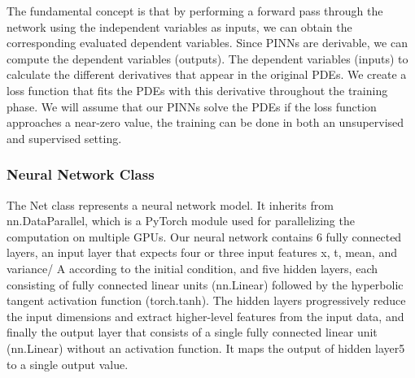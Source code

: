 \documentclass{article}
\begin{document}
The fundamental concept is that by performing a forward pass through the network using the independent variables as inputs, we can obtain the corresponding evaluated dependent variables.
Since PINNs are derivable, we can compute the dependent variables (outputs). The dependent variables (inputs) to calculate the different derivatives that appear in the original PDEs. We create a loss function that fits the PDEs with this derivative throughout the training phase. 
We will assume that our PINNs solve the PDEs if the loss function approaches a near-zero value, the training can be done in both an unsupervised and supervised setting.\\




\subsubsection{Neural Network Class}

The Net class represents a neural network model. It inherits from nn.DataParallel, which is a PyTorch module used for parallelizing the computation on multiple GPUs.
Our neural network contains 6 fully connected layers, an input layer that expects four or three input features x, t, mean, and variance/ A according to the initial condition, and five hidden layers, each consisting of fully connected linear units (nn.Linear) followed by the hyperbolic tangent activation function (torch.tanh). The hidden layers progressively reduce the input dimensions and extract higher-level features from the input data, 
and finally the output layer that consists of a single fully connected linear unit (nn.Linear) without an activation function. It maps the output of hidden layer5 to a single output value.
\end{document}
